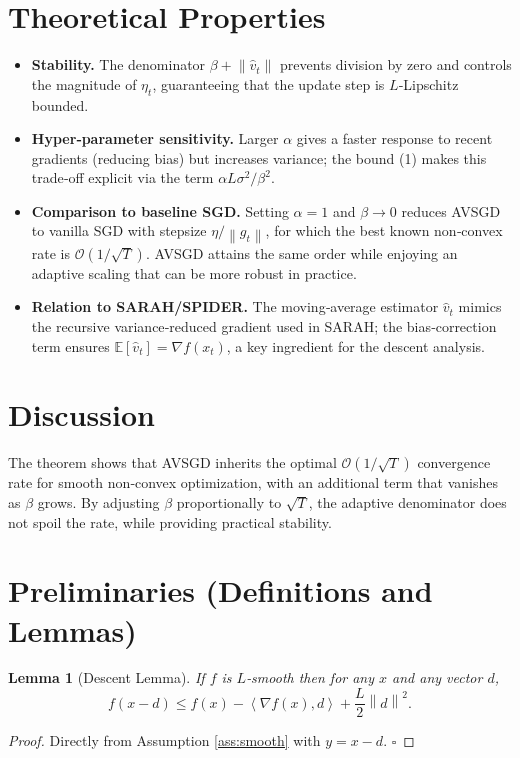 \documentclass{article}
\newtheorem{lemma}{Lemma}
\newcommand{\E}{\mathbb{E}}
\newcommand{\norm}[1]{\left\|#1\right\|}
\newcommand{\ip}[2]{\left\langle #1, #2 \right\rangle}
\newcommand{\grad}{\nabla}
\begin{document}
\section*{Theoretical Properties}
\begin{itemize}[leftmargin=*]
\item \textbf{Stability.} The denominator $\beta+\norm{\hat v_t}$ prevents division by zero and controls the magnitude of $\eta_t$, guaranteeing that the update step is $L$‑Lipschitz bounded.
\item \textbf{Hyper‑parameter sensitivity.} Larger $\alpha$ gives a faster response to recent gradients (reducing bias) but increases variance; the bound (1) makes this trade‑off explicit via the term $\alpha L\sigma^2/\beta^2$.
\item \textbf{Comparison to baseline SGD.} Setting $\alpha=1$ and $\beta\to0$ reduces AVSGD to vanilla SGD with stepsize $\eta/\norm{g_t}$, for which the best known non‑convex rate is $\mathcal{O}(1/\sqrt{T})$. AVSGD attains the same order while enjoying an adaptive scaling that can be more robust in practice.
\item \textbf{Relation to SARAH/SPIDER.} The moving‑average estimator $\hat v_t$ mimics the recursive variance‑reduced gradient used in SARAH; the bias‑correction term ensures $\E[\hat v_t]=\grad f(x_t)$, a key ingredient for the descent analysis.
\end{itemize}

\section*{Discussion}
The theorem shows that AVSGD inherits the optimal $\mathcal{O}(1/\sqrt{T})$ convergence rate for smooth non‑convex optimization, with an additional term that vanishes as $\beta$ grows. By adjusting $\beta$ proportionally to $\sqrt{T}$, the adaptive denominator does not spoil the rate, while providing practical stability.

\newpage
\section*{Preliminaries (Definitions and Lemmas)}
\begin{lemma}[Descent Lemma]\label{lem:descent}
If $f$ is $L$‑smooth then for any $x$ and any vector $d$,
\[
f(x-d)\le f(x)-\ip{\grad f(x)}{d}+\frac{L}{2}\norm{d}^2 .
\]
\end{lemma}
\begin{proof}
Directly from Assumption \ref{ass:smooth} with $y=x-d$. \hfill $\square$
\end{proof}
\end{document}
